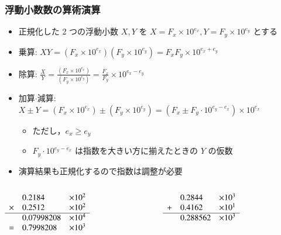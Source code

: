 \begin{frame}[shrink]
\frametitle{浮動小数数の算術演算}
  \begin{itemize}
\item 正規化した 2 つの浮動小数 \(X, Y\) を \(X=F_x\times 10^{e_x}, Y=F_y\times 10^{e_y}\) とする
\item 乗算: \(XY=(F_x\times 10^{e_x})(F_y\times 10^{e_y})=F_xF_y\times 10^{e_x+e_y}\)
\item 除算: \(\frac{X}{Y}=\frac{(F_x\times 10^{e_x})}{(F_y\times 10^{e_y})}=\frac{F_x}{F_y}\times 10^{e_x-e_y}\)
\item 加算\(\cdot\)減算: \(X\pm Y=(F_x\times 10^{e_x})\pm(F_y\times 10^{e_y})=(F_x\pm F_y\cdot 10^{e_y-e_x})\times 10^{e_x}\)
    \begin{itemize}
\item ただし，\(e_x\geq e_y\)
\item \(F_y\cdot 10^{e_y-e_x}\) は指数を大きい方に揃えたときの $Y$ の仮数
    \end{itemize}
\item 演算結果も正規化するので指数は調整が必要
  \end{itemize}
  \begin{example}[算術演算の例]
    \begin{columns}[t]
      \begin{column}{4.5cm}
        \begin{math}
          \begin{array}{cll}
&0.2184&\times 10^2\\
\times&0.2512&\times 10^2\\
\hline
&0.07998208&\times 10^4\\
=&0.7998208&\times 10^3\\
          \end{array}
        \end{math}
      \end{column}
      \begin{column}{4.5cm}
        \begin{math}
          \begin{array}{cll}
&0.2844&\times 10^3\\
+&0.4162&\times 10^1\\
\hline
&0.288562&\times 10^3\\
          \end{array}
        \end{math}
      \end{column}
    \end{columns}
  \end{example}
\end{frame}
